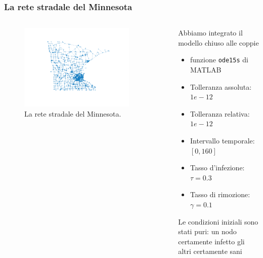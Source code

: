 \documentclass{beamer}
\theoremstyle{definition}
\theoremstyle{plain}
\begin{document}
\begin{frame}
\frametitle{La rete stradale del Minnesota}
\begin{columns}
\begin{column}{0.5\textwidth}
\begin{figure}
\centering
\includegraphics[width=0.85\textwidth]{Figure/minnesota}
\caption{La rete stradale del Minnesota.}
\end{figure}
\end{column}
\begin{column}{0.5\textwidth}
Abbiamo integrato il modello chiuso alle coppie 
\begin{itemize}
\item funzione \texttt{ode15s} di MATLAB
\item Tolleranza assoluta: $1e-12$
\item Tolleranza relativa: $1e-12$
\item Intervallo temporale: $[0, 160]$
\item Tasso d'infezione: $\tau = 0.3$
\item Tasso di rimozione: $\gamma = 0.1$
\end{itemize}
Le condizioni iniziali sono stati puri: un nodo certamente infetto gli altri certamente sani 
\end{column}
\end{columns}
\end{frame}
\end{document}
